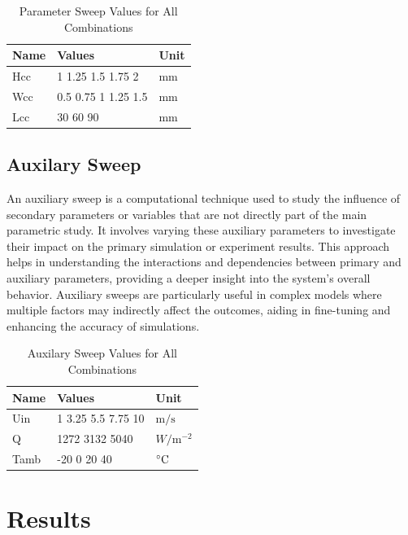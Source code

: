         \begin{table}[h]
        \centering
        \begin{tabularx}{\textwidth}{X X X}
        \toprule
        \textbf{Name} & \textbf{Values} & \textbf{Unit} \\ 
        \midrule
        Hcc & 1 1.25 1.5 1.75 2 & \(\text{mm}\) \\ 
        Wcc & 0.5 0.75 1 1.25 1.5 & \(\text{mm}\) \\ 
        Lcc & 30 60 90 & \(\text{mm}\) \\ 
        \bottomrule
        \end{tabularx}
        \caption{Parameter Sweep Values for All Combinations}
        \end{table}
    \subsection{Auxilary Sweep}
        An auxiliary sweep is a computational technique used to study the influence
        of secondary parameters or variables that are not directly part of the main 
        parametric study. It involves varying these auxiliary parameters to 
        investigate their impact on the primary simulation or experiment results. 
        This approach helps in understanding the interactions and dependencies 
        between primary and auxiliary parameters, providing a deeper insight into 
        the system's overall behavior. Auxiliary sweeps are particularly useful in 
        complex models where multiple factors may indirectly affect the outcomes, 
        aiding in fine-tuning and enhancing the accuracy of simulations.

        \begin{table}[h]
        \centering
        \begin{tabularx}{\textwidth}{X X X}
        \toprule
        \textbf{Name} & \textbf{Values} & \textbf{Unit} \\ 
        \midrule
        Uin & 1 3.25 5.5 7.75 10 & \(\text{m}/\text{s}\) \\ 
        Q & 1272 3132 5040 & \(W/\text{m}^{-2}\) \\ 
        Tamb & -20 0 20 40 & \(\degree \text{C}\) \\ 
        \bottomrule
        \end{tabularx}
        \caption{Auxilary Sweep Values for All Combinations}
        \end{table}
    
    \section{Results}
